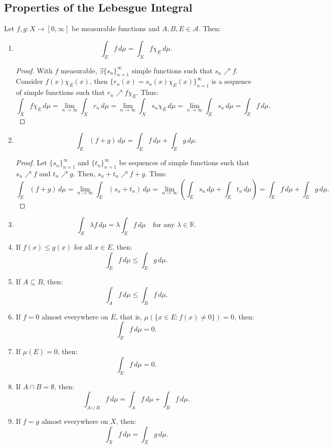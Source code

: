 \documentclass[11pt]{article}
\begin{document}
\subsection{Properties of the Lebesgue Integral}
Let \(f, g: X \to [0, \infty]\) be measurable functions and \(A, B, E \in \mathcal{A}\). Then:
\begin{enumerate}
    \item \[ \int_E f \,d\mu = \int_X f \chi_E \,d\mu.\]
    \begin{proof}
        With \(f\) measurable, \(\exists\{s_n\}_{n = 1}^{\infty}\) simple functions such that \(s_n \nearrow f\). Consider \(f(x) \chi_E(x)\), then \(\{r_n(x) = s_n(x) \chi_E(x)\}_{n = 1}^{\infty}\) is a sequence of simple functions such that \(r_n \nearrow f \chi_E\). Thus:
        \[\int_X f \chi_E \,d\mu = \lim_{n \to \infty} \int_X r_n \,d\mu = \lim_{n \to \infty} \int_X s_n \chi_E \,d\mu = \lim_{n \to \infty} \int_E s_n \,d\mu = \int_E f \,d\mu.\]
    \end{proof}
    \item \[ \int_E (f + g) \,d\mu = \int_E f \,d\mu + \int_E g \,d\mu.\]
    \begin{proof}
        Let \(\{s_n\}_{n=1}^{\infty}\) and \(\{t_n\}_{n=1}^{\infty}\) be sequences of simple functions such that \(s_n \nearrow f\) and \(t_n \nearrow g\). Then, \(s_n + t_n \nearrow f + g\). Thus:
        \[\int_E (f + g) \,d\mu = \lim_{n \to \infty} \int_E (s_n + t_n) \,d\mu = \lim_{n \to \infty} \left(\int_E s_n \,d\mu + \int_E t_n \,d\mu\right) = \int_E f \,d\mu + \int_E g \,d\mu.\]
    \end{proof}
    \item \[\int_E \lambda f \,d\mu = \lambda \int_E f \,d\mu \quad \text{for any } \lambda \in \mathbb{R}.\]
    \item If \(f(x) \leq g(x)\) for all \(x \in E\), then:
    \[\int_E f \,d\mu \leq \int_E g \,d\mu.\]
    \item If \(A \subseteq B\), then:
    \[\int_A f \,d\mu \leq \int_B f \,d\mu.\]
    \item If \(f = 0\) almost everywhere on \(E\), that is, \(\mu(\{x \in E : f(x) \neq 0\}) = 0\), then:
    \[\int_E f \,d\mu = 0.\]
    \item If \(\mu(E) = 0\), then:
    \[\int_E f \,d\mu = 0.\]
    \item If \(A \cap B = \emptyset\), then:
    \[\int_{A \cup B} f \,d\mu = \int_A f \,d\mu + \int_B f \,d\mu.\]
    \item If \(f = g\) almost everywhere on \(X\), then:
    \[\int_X f \,d\mu = \int_X g \,d\mu.\]
\end{enumerate}
\end{document}
